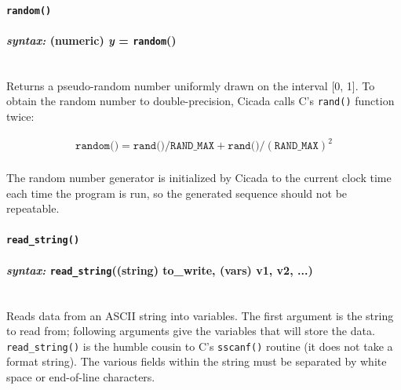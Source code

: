 \documentclass{article}
\begin{document}
  





\paragraph{\texttt{random()}\\\\
\normalfont \emph{syntax: } (numeric) \emph{y} = \texttt{random}()\\\\}

Returns a pseudo-random number uniformly drawn on the interval [0, 1].  To obtain the random number to double-precision, Cicada calls C's \verb$rand()$ function twice:

\begin{align*}
\texttt{random()} = \texttt{rand()}/\texttt{RAND\_MAX} + \texttt{rand()}/(\texttt{RAND\_MAX})^2\\
\end{align*}

\noindent The random number generator is initialized by Cicada to the current clock time each time the program is run, so the generated sequence should not be repeatable.\\






\paragraph{\texttt{read\_string()}\\\\
\normalfont \emph{syntax: } \texttt{read\_string}((string) to\_write, (vars) v1, v2, ...)\\\\}
 

Reads data from an ASCII string into variables.  The first argument is the string to read from; following arguments give the variables that will store the data.  \texttt{read\_string()} is the humble cousin to C's \texttt{sscanf()} routine (it does not take a format string).  The various fields within the string must be separated by white space or end-of-line characters.
\end{document}
